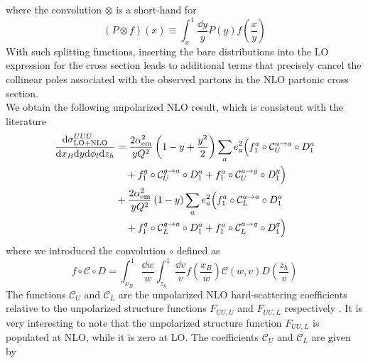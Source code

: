 where the convolution $\otimes$ is a short-hand for
\begin{equation}
    (P\otimes f )(x)\equiv\int_x^1\frac{\dd y}{y} P(y) f\left(\frac{x}{y}\right)
\end{equation}
With such splitting functions, inserting the bare distributions into the LO expression for the cross section leads to additional terms that precisely cancel the collinear poles associated with the observed partons in the NLO partonic cross section. \\
We obtain the following unpolarized NLO result, which is consistent with the literature \cite{de_Florian_1998}
\begin{equation}
    \begin{aligned}
        \frac{\dd \sigma^{UUU}_{\rm LO+NLO}}{\dd x_B \dd y \dd \phi_l \dd z_h}&=\frac{2 \alpha_{\rm em}^2}{y Q^2} \left(1-y+\frac{y^2}{2}\right)\sum_a e_a^2 \Big(f_1^a \circ \mathcal{C}_U^{a \to a} \circ D_1^a \\
        &\quad +f_1^g \circ \mathcal{C}_{U}^{g \to a} \circ D_1^a+f_1^a \circ \mathcal{C}_U^{a \to g} \circ D_1^g \Big)\\
        &+\frac{2 \alpha_{\rm em}^2}{y Q^2} \left(1-y\right)\sum_a e_a^2 \Big(f_1^a \circ \mathcal{C}_L^{a \to a} \circ D_1^a \\
        &\quad +f_1^g \circ \mathcal{C}_L^{g \to a} \circ D_1^a+f_1^a \circ \mathcal{C}_L^{a \to g} \circ D_1^g \Big)
    \end{aligned}
\end{equation}
where we introduced the convolution $\circ$ defined as
\begin{equation}
    f \circ \mathcal{C} \circ D = \int_{x_B}^1 \frac{\dd w}{w}\int_{z_h}^1 \frac{\dd v}{v} f\left(\frac{x_B}{w}\right) \mathcal{C}\left(w,v\right) D\left(\frac{z_h}{v}\right)
\end{equation}
The functions $\mathcal{C}_U$ and $\mathcal{C}_L$ are the unpolarized NLO hard-scattering coefficients relative to the unpolarized structure functions $F_{UU,U}$ and $F_{UU,L}$ respectively \cite{bacchetta_semi-inclusive_2007}. It is very interesting to note that the unpolarized structure function $F_{UU,L}$ is populated at NLO, while it is zero at LO. The coefficients $\mathcal{C}_U$ and $\mathcal{C}_L$ are given by
